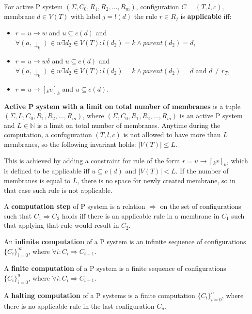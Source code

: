 
For active P system $(\Sigma, C_0, R_1, R_2, \dots , R_m)$, configuration $C = (T, l, c)$, membrane $d\in V(T)$ with label $j = l(d)$ the rule $r\in R_j$ is {\bf applicable} iff:
\begin{itemize}
  \item $r = u\rightarrow w$ and $u\subseteq c(d)$ and $\forall (a,\downarrow_k)\in w \exists d_2\in V(T): l(d_2)=k \wedge parent(d_2) = d$,
  \item $r = u\rightarrow w\delta$ and $u\subseteq c(d)$ and $\forall (a,\downarrow_k)\in w \exists d_2\in V(T): l(d_2)=k \wedge parent(d_2) = d$ and $d\neq r_T$,
  \item $r = u\rightarrow [_k v]_k$ and $u\subseteq c(d)$.
\end{itemize}



{\bf Active P system with a limit on total number of membranes} is a tuple $(\Sigma, L, C_0, R_1, R_2, \dots , R_m)$, where $(\Sigma, C_0, R_1, R_2, \dots , R_m)$ is an active P system and $L\in \mathbb N$ is a limit on total number of membranes. Anytime during the computation, a confuguration $(T, l, c)$ is not allowed to have more than $L$ membranes, so the following invariant holds: $|V(T)|\leq L$.

This is achieved by adding a constraint for rule of the form $r = u\rightarrow [_k v]_k$, which is defined to be applicable iff $u\subseteq c(d)$ and $|V(T)|<L$. If the number of membranes is equal to $L$, there is no space for newly created membrane, so in that case such rule is not applicable.

A {\bf computation step} of P system is a relation $\Rightarrow$ on the set of configurations such that $C_1 \Rightarrow C_2$ holds iff there is an applicable rule in a membrane in $C_1$ such that applying that rule would result in $C_2$.

An {\bf infinite computation} of a P system is an infinite sequence of configurations $\{C_i\}_{i=0}^\infty$, where $\forall i: C_i\Rightarrow C_{i+1}$.

A {\bf finite computation} of a P system is a finite sequence of configurations $\{C_i\}_{i=0}^n$, where $\forall i: C_i\Rightarrow C_{i+1}$.

A {\bf halting computation} of a P systems is a finite computation $\{C_i\}_{i=0}^n$, where there is no applicable rule in the last configuration $C_n$.

